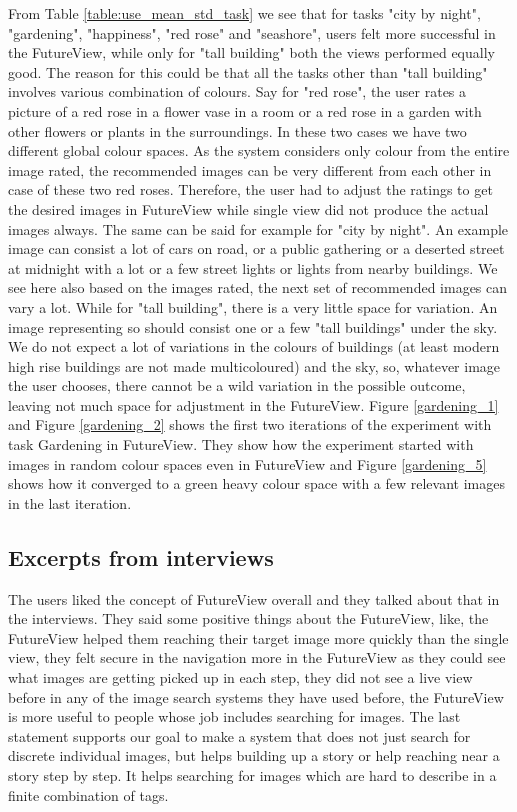 \documentclass[english]{tktltiki}
\begin{document}
From Table \ref{table:use_mean_std_task} we see that for tasks "city by night", "gardening", "happiness", "red rose" and "seashore", users felt more successful in the FutureView, while only for "tall building" both the views performed equally good. The reason for this could be that all the tasks other than "tall building" involves various combination of colours. Say for "red rose", the user rates a picture of a red rose in a flower vase in a room or a red rose in a garden with other flowers or plants in the surroundings. In these two cases we have two different global colour spaces. As the system considers only colour from the entire image rated, the recommended images can be very different from each other in case of these two red roses. Therefore, the user had to adjust the ratings to get the desired images in FutureView while single view did not produce the actual images always. The same can be said for example for "city by night". An example image can consist a lot of cars on road, or a public gathering or a deserted street at midnight with a lot or a few street lights or lights from nearby buildings. We see here also based on the images rated, the next set of recommended images can vary a lot. While for "tall building", there is a very little space for variation. An image representing so should consist one or a few "tall buildings" under the sky. We do not expect a lot of variations in the colours of buildings (at least modern high rise buildings are not made multicoloured) and the sky, so, whatever image the user chooses, there cannot be a wild variation in the possible outcome, leaving not much space for adjustment in the FutureView. Figure \ref{gardening_1} and Figure \ref{gardening_2} shows the first two iterations of the experiment with task Gardening in FutureView. They show how the experiment started with images in random colour spaces even in FutureView and Figure \ref{gardening_5} shows how it converged to a green heavy colour space with a few relevant images in the last iteration.

\subsection{Excerpts from interviews}

The users liked the concept of FutureView overall and they talked about that in the interviews. They said some positive things about the FutureView, like, the FutureView helped them reaching their target image more quickly than the single view, they felt secure in the navigation more in the FutureView as they could see what images are getting picked up in each step, they did not see a live view before in any of the image search systems they have used before, the FutureView is more useful to people whose job includes searching for images. The last statement supports our goal to make a system that does not just search for discrete individual images, but helps building up a story or help reaching near a story step by step. It helps searching for images which are hard to describe in a finite combination of tags.
\end{document}
